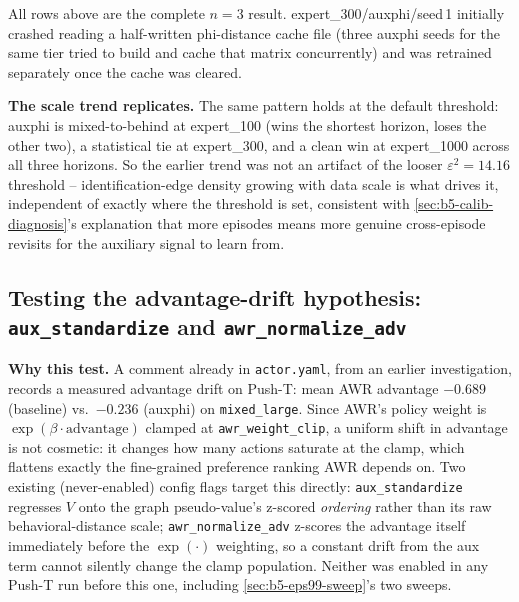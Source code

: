 \documentclass[11pt]{article}
\begin{document}
All rows above are the complete $n{=}3$ result. expert\_300/auxphi/seed\,1 initially crashed
reading a half-written phi-distance cache file (three auxphi seeds for the same tier tried to
build and cache that matrix concurrently) and was retrained separately once the cache was
cleared.

\textbf{The scale trend replicates.} The same pattern holds at the default threshold: auxphi
is mixed-to-behind at expert\_100 (wins the shortest horizon, loses the other two), a
statistical tie at expert\_300, and a clean win at expert\_1000 across all three horizons. So
the earlier trend was not an artifact of the looser $\varepsilon^2=14.16$ threshold --
identification-edge density growing with data scale is what drives it, independent of exactly
where the threshold is set, consistent with \cref{sec:b5-calib-diagnosis}'s explanation that
more episodes means more genuine cross-episode revisits for the auxiliary signal to learn from.

\subsection{Testing the advantage-drift hypothesis: \texttt{aux\_standardize} and \texttt{awr\_normalize\_adv}}
\label{sec:b5-stdadv-sweep}

\textbf{Why this test.} A comment already in \texttt{actor.yaml}, from an earlier
investigation, records a measured advantage drift on Push-T: mean AWR advantage
$-0.689$ (baseline) vs.\ $-0.236$ (auxphi) on \texttt{mixed\_large}. Since AWR's policy
weight is $\exp(\beta \cdot \text{advantage})$ clamped at \texttt{awr\_weight\_clip}, a
uniform shift in advantage is not cosmetic: it changes how many actions saturate at the
clamp, which flattens exactly the fine-grained preference ranking AWR depends on. Two
existing (never-enabled) config flags target this directly:
\texttt{aux\_standardize} regresses $V$ onto the graph pseudo-value's z-scored
\emph{ordering} rather than its raw behavioral-distance scale; \texttt{awr\_normalize\_adv}
z-scores the advantage itself immediately before the $\exp(\cdot)$ weighting, so a
constant drift from the aux term cannot silently change the clamp population. Neither
was enabled in any Push-T run before this one, including \cref{sec:b5-eps99-sweep}'s
two sweeps.
\end{document}
